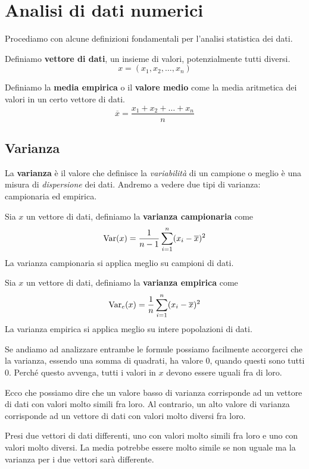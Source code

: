 \chapter{Analisi di dati numerici}
Procediamo con alcune definizioni fondamentali per l'analisi statistica dei dati.

\begin{definition} \label{vettore}
	Definiamo \textbf{vettore di dati}, un insieme di valori, potenzialmente tutti diversi.
	\[ x = (x_1, x_2, \dots, x_n) \]
\end{definition}

\begin{definition}
	Definiamo la \textbf{media empirica} o il \textbf{valore medio} come la media aritmetica dei valori in un
	certo vettore di dati.
	\[ \overline{x} = \frac{x_1 + x_2 + \dots + x_n}{n} \]
\end{definition}

\section{Varianza}
La \textbf{varianza} è il valore che definisce la \emph{variabilità} di un campione o meglio è una misura di
\emph{dispersione} dei dati. Andremo a vedere due tipi di varianza: campionaria ed empirica.

\begin{definition}
	Sia $x$ un vettore di dati, definiamo la \textbf{varianza campionaria} come
	\[ \operatorname{Var}(x) = \frac{1}{n - 1} \sum_{i=1}^n (x_i - \overline{x})^2 \]
	La varianza campionaria si applica meglio su campioni di dati.
\end{definition}

\begin{definition}
	Sia $x$ un vettore di dati, definiamo la \textbf{varianza empirica} come
	\[ \operatorname{Var}_e(x) = \frac{1}{n} \sum_{i=1}^n (x_i - \overline{x})^2 \]
	La varianza empirica si applica meglio su intere popolazioni di dati.
\end{definition}

\begin{observation}
	Se andiamo ad analizzare entrambe le formule possiamo facilmente accorgerci che la varianza, essendo una
	somma di quadrati, ha valore 0, quando questi sono tutti 0. Perché questo avvenga, tutti i valori in $x$
	devono essere uguali fra di loro.

	Ecco che possiamo dire che un valore basso di varianza corrisponde ad un vettore di dati con valori molto
	simili fra loro. Al contrario, un alto valore di varianza corrisponde ad un vettore di dati con valori molto
	diversi fra loro.

	Presi due vettori di dati differenti, uno con valori molto simili fra loro e uno con valori molto diversi. La
	media potrebbe essere molto simile se non uguale ma la varianza per i due vettori sarà differente.
\end{observation}

